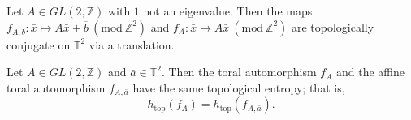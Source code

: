 \documentclass[10pt,a4paper]{amsart}
\begin{document}
\begin{proposition}\label{conjugacy}
Let $A \in GL(2,\mathbb{Z})$ with $1$ not an eigenvalue.  
Then the maps $f_{A,\overline{b}}: \bar{x} \mapsto A\bar{x} + \overline{b}~(\text{mod}~\mathbb{Z}^2)$ and $f_A:\bar{x} \mapsto A\bar{x}~(\text{mod}~\mathbb{Z}^2)$ are topologically conjugate on $\mathbb{T}^2$ via a translation.
\end{proposition}

\begin{theorem}\label{top entrpy}
   Let $A \in GL(2,\mathbb{Z})$ and $\bar{a} \in \mathbb{T}^2$. Then the toral automorphism $f_A$ and the affine toral automorphism $f_{A,\bar{a}}$ have the same topological entropy; that is,
\[
h_{\mathrm{top}}(f_A) = h_{\mathrm{top}}(f_{A,\bar{a}}).
\]
 
\end{theorem}
\end{document}
